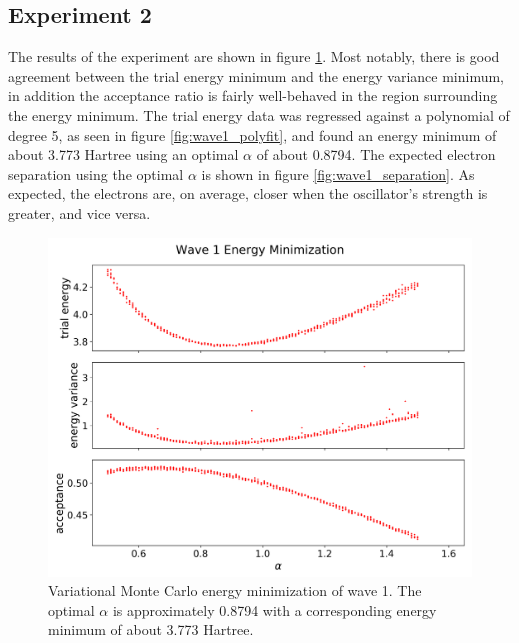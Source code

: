 \documentclass[nofootinbib,reprint,english]{revtex4-1}
\begin{document}
\subsection{Experiment 2}
The results of the experiment are shown in figure \ref{fig:wave1_optimization}. Most notably, there is good agreement between the trial energy minimum and the energy variance minimum, in addition the acceptance ratio is fairly well-behaved in the region surrounding the energy minimum. The trial energy data was regressed against a polynomial of degree 5, as seen in figure \ref{fig:wave1_polyfit}, and found an energy minimum of about 3.773 Hartree using an optimal \(\alpha\) of about 0.8794. The expected electron separation using the optimal \(\alpha\) is shown in figure \ref{fig:wave1_separation}. As expected, the electrons are, on average, closer when the oscillator's strength is greater, and vice versa.

\begin{figure}
\centering
\includegraphics[scale=0.34]{../results/wave1/energy_minimization_2.png}
\caption{Variational Monte Carlo energy minimization of wave 1. The optimal \(\alpha\) is approximately 0.8794 with a corresponding energy minimum of about 3.773 Hartree.}\label{fig:wave1_optimization}
\end{figure}
\end{document}
